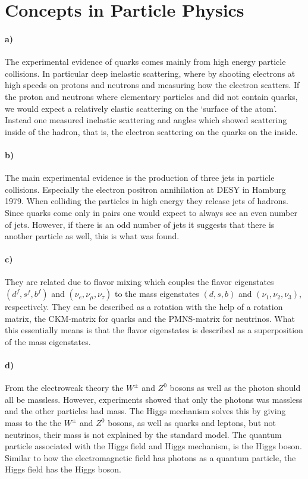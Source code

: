 \section{Concepts in Particle Physics}
\paragraph{a)} The experimental evidence of quarks comes mainly from high energy particle collisions. In particular deep inelastic scattering, where by shooting electrons at high speeds on protons and neutrons and measuring how the electron scatters. If the proton and neutrons where elementary particles and did not contain quarks, we would expect a relatively elastic scattering on the `surface of the atom'. Instead one measured inelastic scattering and angles which showed scattering inside of the hadron, that is, the electron scattering on the quarks on the inside.

\paragraph{b)} The main experimental evidence is the production of three jets in particle collisions. Especially the electron positron annihilation at DESY in Hamburg 1979. When colliding the particles in high energy they release jets of hadrons. Since quarks come only in pairs one would expect to always see an even number of jets. However, if there is an odd number of jets it suggests that there is another particle as well, this is what was found.

\paragraph{c)} They are related due to flavor mixing which couples the flavor eigenstates $(d^f, s^f, b^f)$ and $(\nu_e, \nu_\mu, \nu_\tau)$ to the mass eigenstates $(d, s, b)$ and $(\nu_1, \nu_2, \nu_3)$, respectively. They can be described as a rotation with the help of a rotation matrix, the CKM-matrix for quarks and the PMNS-matrix for neutrinos. What this essentially means is that the flavor eigenstates is described as a superposition of the mass eigenstates.

\paragraph{d)} From the electroweak theory the $W^\pm$ and $Z^0$ bosons as well as the photon should all be massless. However, experiments showed that only the photons was massless and the other particles had mass. The Higgs mechanism solves this by giving mass to the the $W^\pm$ and $Z^0$ bosons, as well as quarks and leptons, but not neutrinos, their mass is not explained by the standard model. The quantum particle associated with the Higgs field and Higgs mechanism, is the Higgs boson. Similar to how the electromagnetic field has photons as a quantum particle, the Higgs field has the Higgs boson.